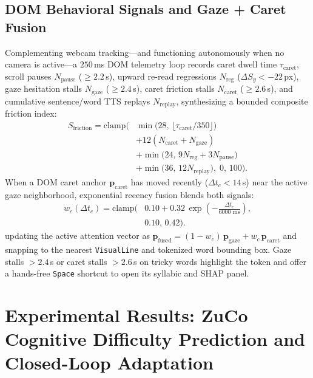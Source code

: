 \documentclass[conference]{IEEEtran}
\begin{document}
\subsection{DOM Behavioral Signals and Gaze + Caret Fusion}
Complementing webcam tracking---and functioning autonomously when no camera is active---a $250$\,ms DOM telemetry loop records caret dwell time $\tau_{\text{caret}}$, scroll pauses $N_{\text{pause}}$ ($\ge 2.2$\,s), upward re-read regressions $N_{\text{reg}}$ ($\Delta S_y < -22$\,px), gaze hesitation stalls $N_{\text{gaze}}$ ($\ge 2.4$\,s), caret friction stalls $N_{\text{caret}}$ ($\ge 2.6$\,s), and cumulative sentence/word TTS replays $N_{\text{replay}}$, synthesizing a bounded composite friction index:
\begin{equation}
\begin{aligned}
    S_{\text{friction}} = \text{clamp}\Big(&
        \min\!\big(28,\,\lfloor\tau_{\text{caret}}/350\rfloor\big) \\
        &+ 12(N_{\text{caret}} + N_{\text{gaze}}) \\
        &+ \min\!\big(24,\,9N_{\text{reg}}+3N_{\text{pause}}\big) \\
        &+ \min\!\big(36,\,12N_{\text{replay}}\big),
        \;0,\,100\Big).
\end{aligned}
\end{equation}
When a DOM caret anchor $\mathbf{p}_{\text{caret}}$ has moved recently ($\Delta t_c < 14$\,s) near the active gaze neighborhood, exponential recency fusion blends both signals:
\begin{equation}
\begin{aligned}
    w_c(\Delta t_c)
        = \text{clamp}\!\Bigg(&0.10 + 0.32\,
        \exp\!\left(-\frac{\Delta t_c}{6000\text{ ms}}\right),\\
        &0.10,\,0.42\Bigg).
\end{aligned}
\end{equation}
updating the active attention vector as $\mathbf{p}_{\text{fused}} = (1 - w_c)\,\mathbf{p}_{\text{gaze}} + w_c\,\mathbf{p}_{\text{caret}}$ and snapping to the nearest \texttt{VisualLine} and tokenized word bounding box. Gaze stalls $>2.4$\,s or caret stalls $>2.6$\,s on tricky words highlight the token and offer a hands-free \texttt{Space} shortcut to open its syllabic and SHAP panel.

\section{Experimental Results: ZuCo Cognitive Difficulty Prediction and Closed-Loop Adaptation}
\end{document}
